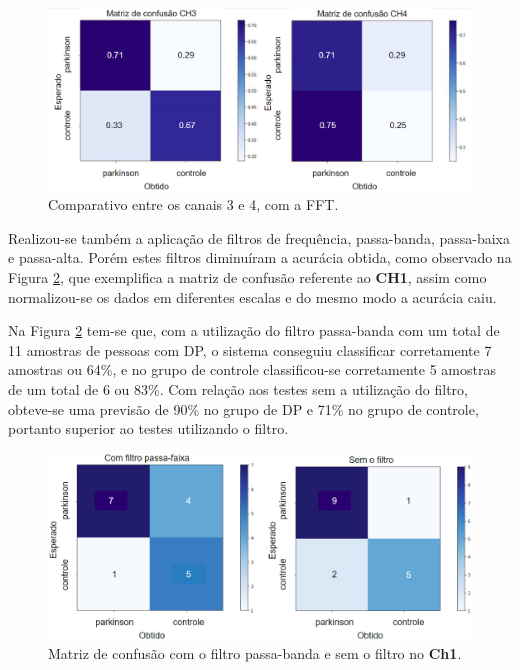 \begin{figure}[!t]
    \centering
    \includegraphics[width=1.1\textwidth]{figuras/3e4.eps}
    \caption{Comparativo entre os canais 3 e 4, com a FFT.}
    \label{fcomparativo3}
\end{figure}


Realizou-se também a aplicação de filtros de frequência, passa-banda, passa-baixa e passa-alta. Porém estes filtros diminuíram a acurácia obtida, como observado na Figura \ref{comesemfiltro}, que exemplifica a matriz de confusão referente ao \textbf{CH1}, assim como normalizou-se os dados em diferentes escalas e do mesmo modo a acurácia caiu. 

Na Figura \ref{comesemfiltro} tem-se que, com a utilização do filtro passa-banda com um total de 11 amostras de pessoas com DP, o sistema conseguiu classificar corretamente 7 amostras ou 64\%, e no grupo de controle classificou-se corretamente 5 amostras de um total de 6 ou 83\%. Com relação aos testes sem a utilização do filtro, obteve-se uma previsão de 90\% no grupo de DP e 71\% no grupo de controle, portanto superior ao testes utilizando o filtro.


\begin{figure}[t]
    \centering
    \includegraphics[width=1\textwidth]{figuras/comesemfiltro.eps}
    \caption{Matriz de confusão com o filtro passa-banda e sem o filtro no \textbf{Ch1}.}
    \label{comesemfiltro}
\end{figure}

